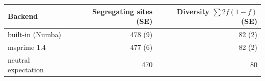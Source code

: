\begin{tabular}{lrr}
\toprule
Backend & Segregating sites (SE) & Diversity $\sum 2f(1-f)$ (SE) \\
\midrule
built-in (Numba) & 478 (9) & 82 (2) \\
msprime 1.4 & 477 (6) & 82 (2) \\
neutral expectation & 470 & 80 \\
\bottomrule
\end{tabular}
